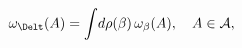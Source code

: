 \begin{equation} \label{mixture}
\omega_\Delt(A) = 
\int \! d\rho(\beta) \, \omega_\beta(A), \quad A \in {\cal A},
\end{equation}

